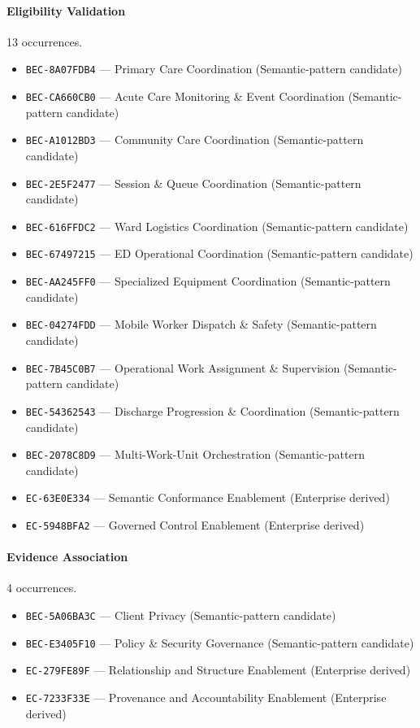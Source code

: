 \documentclass[11pt,a4paper,openany]{book}
\begin{document}
\paragraph{Eligibility Validation} 13 occurrences.\par
\begin{itemize}
\item \texttt{BEC-8A07FDB4} --- Primary Care Coordination (Semantic-pattern candidate)
\item \texttt{BEC-CA660CB0} --- Acute Care Monitoring \& Event Coordination (Semantic-pattern candidate)
\item \texttt{BEC-A1012BD3} --- Community Care Coordination (Semantic-pattern candidate)
\item \texttt{BEC-2E5F2477} --- Session \& Queue Coordination (Semantic-pattern candidate)
\item \texttt{BEC-616FFDC2} --- Ward Logistics Coordination (Semantic-pattern candidate)
\item \texttt{BEC-67497215} --- ED Operational Coordination (Semantic-pattern candidate)
\item \texttt{BEC-AA245FF0} --- Specialized Equipment Coordination (Semantic-pattern candidate)
\item \texttt{BEC-04274FDD} --- Mobile Worker Dispatch \& Safety (Semantic-pattern candidate)
\item \texttt{BEC-7B45C0B7} --- Operational Work Assignment \& Supervision (Semantic-pattern candidate)
\item \texttt{BEC-54362543} --- Discharge Progression \& Coordination (Semantic-pattern candidate)
\item \texttt{BEC-2078C8D9} --- Multi-Work-Unit Orchestration (Semantic-pattern candidate)
\item \texttt{EC-63E0E334} --- Semantic Conformance Enablement (Enterprise derived)
\item \texttt{EC-5948BFA2} --- Governed Control Enablement (Enterprise derived)
\end{itemize}
\paragraph{Evidence Association} 4 occurrences.\par
\begin{itemize}
\item \texttt{BEC-5A06BA3C} --- Client Privacy (Semantic-pattern candidate)
\item \texttt{BEC-E3405F10} --- Policy \& Security Governance (Semantic-pattern candidate)
\item \texttt{EC-279FE89F} --- Relationship and Structure Enablement (Enterprise derived)
\item \texttt{EC-7233F33E} --- Provenance and Accountability Enablement (Enterprise derived)
\end{itemize}
\end{document}
